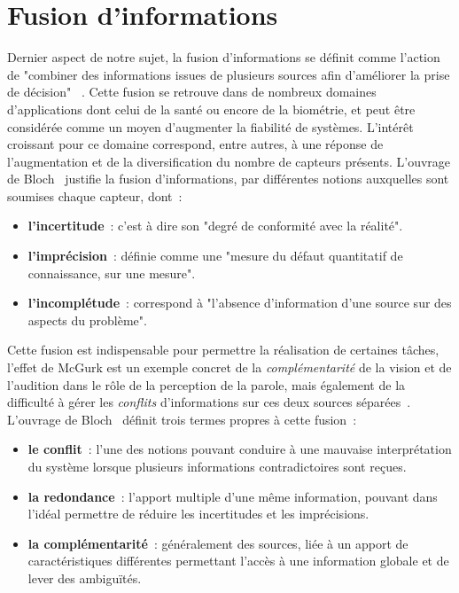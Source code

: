\clearpage

\section{Fusion d’informations}
\label{sec:fusion_information}
Dernier aspect de notre sujet, la fusion d’informations se définit comme l’action de "combiner des informations issues de plusieurs sources afin d’améliorer la prise de décision" ~\cite{Bloch2003}. Cette fusion se retrouve dans de nombreux domaines d'applications dont celui de la santé ou encore de la biométrie, et peut être considérée comme un moyen d'augmenter la fiabilité de systèmes. L'intérêt croissant pour ce domaine correspond, entre autres, à une réponse de l'augmentation et de la diversification du nombre de capteurs présents. L'ouvrage de Bloch~\cite{Bloch2003} justifie la fusion d'informations, par différentes notions auxquelles sont soumises chaque capteur, dont~:
\begin{itemize}
    \item \textbf{l'incertitude}~: c'est à dire son "degré de conformité avec la réalité".
    \item \textbf{l'imprécision}~: définie comme une "mesure du défaut quantitatif de connaissance, sur une mesure".
    \item \textbf{l'incomplétude}~: correspond à "l'absence d'information d'une source sur des aspects du problème".
\end{itemize}\par

Cette fusion est indispensable pour permettre la réalisation de certaines tâches, l'effet de McGurk est un exemple concret de la \textit{complémentarité} de la vision et de l'audition dans le rôle de la perception de la parole, mais également de la difficulté à gérer les \textit{conflits} d'informations sur ces deux sources séparées~\cite{Mcgurk1976}. L'ouvrage de Bloch~\cite{Bloch2003} définit trois termes propres à cette fusion~:
\begin{itemize}
    \item \textbf{le conflit}~: l'une des notions pouvant conduire à une mauvaise interprétation du système lorsque plusieurs informations contradictoires sont reçues.
    \item \textbf{la redondance}~: l'apport multiple d'une même information, pouvant dans l'idéal permettre de réduire les incertitudes et les imprécisions.
    \item \textbf{la complémentarité}~: généralement des sources, liée à un apport de caractéristiques différentes permettant l'accès à une information globale et de lever des ambiguïtés.
\end{itemize}\par

